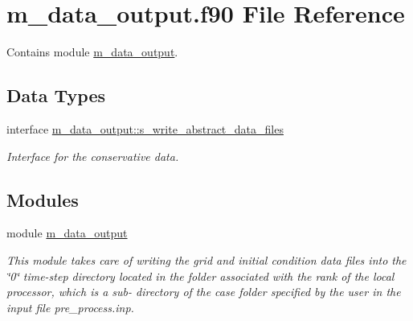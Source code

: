 \hypertarget{m__data__output_8f90}{}\section{m\+\_\+data\+\_\+output.\+f90 File Reference}
\label{m__data__output_8f90}


Contains module \hyperlink{namespacem__data__output}{m\+\_\+data\+\_\+output}.  


\subsection*{Data Types}
\begin{DoxyCompactItemize}
\item 
interface \hyperlink{interfacem__data__output_1_1s__write__abstract__data__files}{m\+\_\+data\+\_\+output\+::s\+\_\+write\+\_\+abstract\+\_\+data\+\_\+files}
\begin{DoxyCompactList}\small\item\em Interface for the conservative data. \end{DoxyCompactList}\end{DoxyCompactItemize}
\subsection*{Modules}
\begin{DoxyCompactItemize}
\item 
module \hyperlink{namespacem__data__output}{m\+\_\+data\+\_\+output}
\begin{DoxyCompactList}\small\item\em This module takes care of writing the grid and initial condition data files into the \char`\"{}0\char`\"{} time-\/step directory located in the folder associated with the rank of the local processor, which is a sub-\/ directory of the case folder specified by the user in the input file pre\+\_\+process.\+inp. \end{DoxyCompactList}\end{DoxyCompactItemize}
